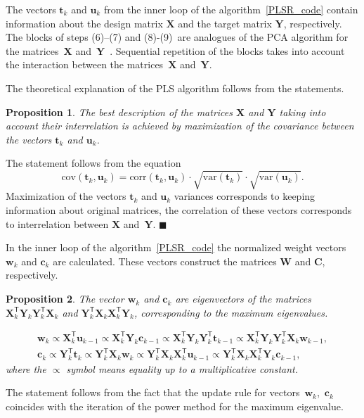 \documentclass[12pt,oneside]{article}
\newtheorem{proposition}{Proposition}
\theoremstyle{definition}
\newcommand{\bw}{\mathbf{w}}
\newcommand{\bY}{\mathbf{Y}}
\newcommand{\bX}{\mathbf{X}}
\newcommand{\bu}{\mathbf{u}}
\newcommand{\bt}{\mathbf{t}}
\newcommand{\bc}{\mathbf{c}}
\newcommand{\bC}{\mathbf{C}}
\newcommand{\bW}{\mathbf{W}}
\newcommand{\T}{\mathsf{T}}
\begin{document}
The vectors $\bt_k$ and $\bu_k$ from the inner loop of the algorithm~\ref{PLSR_code} contain information about the design matrix $\bX$ and the target matrix $\bY$, respectively. 
The blocks of steps (6)--(7) and (8)-(9)~are analogues of the PCA algorithm for the matrices~$\bX$ and~$\bY$~\cite{geladi1986partial}. 
Sequential repetition of the blocks takes into account the interaction between the matrices~$\bX$ and~$\bY$.

The theoretical explanation of the PLS algorithm follows from the statements.
\begin{proposition}
	The best description of the matrices $\bX$ and $\bY$ taking into account their interrelation is achieved by maximization of the covariance between the vectors $\bt_k$ and $\bu_k$.
\end{proposition}
The statement follows from the equation
\begin{equation}
\text{cov} (\bt_k, \bu_k) = \text{corr} (\bt_k, \bu_k) \cdot \sqrt{\text{var}(\bt_k)} \cdot \sqrt{\text{var}(\bu_k)}.
\end{equation}
Maximization of the vectors $\bt_k$ and $\bu_k$ variances corresponds to keeping information about original matrices, the correlation of these vectors corresponds to interrelation between $\bX$ and~$\bY$. $\blacksquare$

In the inner loop of the algorithm~\ref{PLSR_code} the normalized weight vectors $\bw_k$ and $\bc_k$ are calculated. 
These vectors construct the matrices $\bW$ and $\bC$, respectively.

\begin{proposition}
	The vector $\bw_k$ and $\bc_k$ are eigenvectors of the matrices $\bX_k^{\T} \bY_k \bY_k^{\T} \bX_k$ and $\bY_k^{\T} \bX_k \bX_k^{\T} \bY_k$, corresponding to the maximum eigenvalues.
	
	\begin{align}
	\bw_k \varpropto \bX_k^{\T} \bu_{k-1} \varpropto \bX_k^{\T} \bY_k \bc_{k-1} \varpropto \bX_k^{\T} \bY_k \bY_k^{\T} \bt_{k-1} \varpropto \bX_k^{\T} \bY_k \bY_k^{\T} \bX_k \bw_{k-1}, \\
	\bc_k \varpropto \bY_k^{\T} \bt_k \varpropto \bY_k^{\T} \bX_k \bw_k \varpropto \bY_k^{\T} \bX_k \bX_k^{\T} \bu_{k-1} \varpropto \bY_k^{\T} \bX_k \bX_k^{\T} \bY_k \bc_{k-1},
	\end{align}
	where the $\varpropto$ symbol means equality up to a multiplicative constant.
	\label{st:eig}
\end{proposition}

The statement follows from the fact that the update rule for vectors~$\bw_k$,~$\bc_k$ coincides with the iteration of the power method for the maximum eigenvalue.
\end{document}
